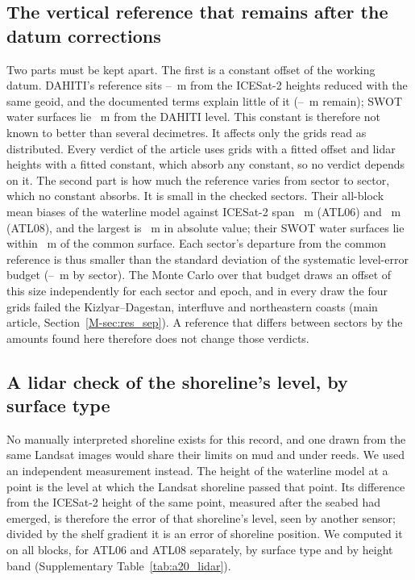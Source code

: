 \subsection*{The vertical reference that remains after the datum corrections}
Two parts must be kept apart. The first is a constant offset of the working datum. DAHITI's reference sits --~m from the ICESat-2 heights reduced with the same geoid, and the documented terms explain little of it (--~m remain); SWOT water surfaces lie ~m from the DAHITI level. This constant is therefore not known to better than several decimetres. It affects only the grids read as distributed. Every verdict of the article uses grids with a fitted offset and lidar heights with a fitted constant, which absorb any constant, so no verdict depends on it. The second part is how much the reference varies from sector to sector, which no constant absorbs. It is small in the checked sectors. Their all-block mean biases of the waterline model against ICESat-2 span ~m (ATL06) and ~m (ATL08), and the largest is ~m in absolute value; their SWOT water surfaces lie within ~m of the common surface. Each sector's departure from the common reference is thus smaller than the standard deviation of the systematic level-error budget (--~m by sector). The Monte Carlo over that budget draws an offset of this size independently for each sector and epoch, and in every draw the four grids failed the Kizlyar--Dagestan, interfluve and northeastern coasts (main article, Section~\ref{M-sec:res_sep}). A reference that differs between sectors by the amounts found here therefore does not change those verdicts.

\subsection*{A lidar check of the shoreline's level, by surface type}
No manually interpreted shoreline exists for this record, and one drawn from the same Landsat images would share their limits on mud and under reeds. We used an independent measurement instead. The height of the waterline model at a point is the level at which the Landsat shoreline passed that point. Its difference from the ICESat-2 height of the same point, measured after the seabed had emerged, is therefore the error of that shoreline's level, seen by another sensor; divided by the shelf gradient it is an error of shoreline position. We computed it on all blocks, for ATL06 and ATL08 separately, by surface type and by height band (Supplementary Table~\ref{tab:a20_lidar}).


